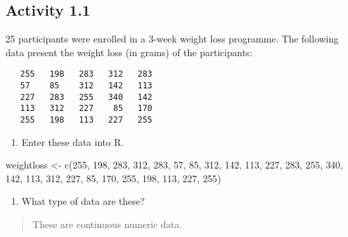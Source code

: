 \documentclass[
]{memoir}
\newenvironment{Shaded}{\begin{snugshade}}{\end{snugshade}}
\newcommand{\DecValTok}[1]{\textcolor[rgb]{0.00,0.00,0.81}{#1}}
\newcommand{\FunctionTok}[1]{\textcolor[rgb]{0.00,0.00,0.00}{#1}}
\newcommand{\NormalTok}[1]{#1}
\newcommand{\OtherTok}[1]{\textcolor[rgb]{0.56,0.35,0.01}{#1}}
\providecommand{\tightlist}{%
  \setlength{\itemsep}{0pt}\setlength{\parskip}{0pt}}
\begin{document}
\hypertarget{activity-1.1}{%
\subsection*{Activity 1.1}\label{activity-1.1}}

25 participants were enrolled in a 3-week weight loss programme. The following data present the weight loss (in grams) of the participants:

\begin{verbatim}
   255   198   283   312   283
   57    85    312   142   113
   227   283   255   340   142
   113   312   227    85   170
   255   198   113   227   255
\end{verbatim}

\begin{enumerate}
\def\labelenumi{\alph{enumi})}
\tightlist
\item
  Enter these data into R.
\end{enumerate}

\begin{Shaded}
\begin{Highlighting}[]
\NormalTok{weightloss }\OtherTok{\textless{}{-}} \FunctionTok{c}\NormalTok{(}\DecValTok{255}\NormalTok{, }\DecValTok{198}\NormalTok{, }\DecValTok{283}\NormalTok{, }\DecValTok{312}\NormalTok{, }\DecValTok{283}\NormalTok{, }\DecValTok{57}\NormalTok{,  }\DecValTok{85}\NormalTok{, }\DecValTok{312}\NormalTok{, }\DecValTok{142}\NormalTok{, }\DecValTok{113}\NormalTok{,}
                \DecValTok{227}\NormalTok{, }\DecValTok{283}\NormalTok{, }\DecValTok{255}\NormalTok{, }\DecValTok{340}\NormalTok{, }\DecValTok{142}\NormalTok{, }\DecValTok{113}\NormalTok{, }\DecValTok{312}\NormalTok{, }\DecValTok{227}\NormalTok{,  }\DecValTok{85}\NormalTok{, }\DecValTok{170}\NormalTok{,}
                \DecValTok{255}\NormalTok{, }\DecValTok{198}\NormalTok{, }\DecValTok{113}\NormalTok{, }\DecValTok{227}\NormalTok{, }\DecValTok{255}\NormalTok{)}
\end{Highlighting}
\end{Shaded}

\begin{enumerate}
\def\labelenumi{\alph{enumi})}
\setcounter{enumi}{1}
\tightlist
\item
  What type of data are these?
\end{enumerate}

\begin{quote}
These are continuous numeric data.
\end{quote}
\end{document}
